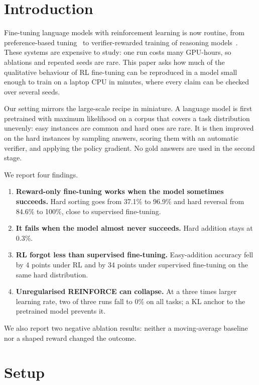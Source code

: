 \documentclass[10pt,twocolumn]{article}
\begin{document}
\section{Introduction}
Fine-tuning language models with reinforcement learning is now routine, from preference-based
tuning~\cite{ouyang2022} to verifier-rewarded training of reasoning models~\cite{shao2024,guo2025}.
These systems are expensive to study: one run costs many GPU-hours, so ablations and repeated seeds
are rare. This paper asks how much of the qualitative behaviour of RL fine-tuning can be reproduced
in a model small enough to train on a laptop CPU in minutes, where every claim can be checked over
several seeds.

Our setting mirrors the large-scale recipe in miniature. A language model is first pretrained with
maximum likelihood on a corpus that covers a task distribution unevenly: easy instances are common
and hard ones are rare. It is then improved on the hard instances by sampling answers, scoring them
with an automatic verifier, and applying the policy gradient. No gold answers are used in the second
stage.

We report four findings.
\begin{enumerate}
\itemsep0pt
\item \textbf{Reward-only fine-tuning works when the model sometimes succeeds.} Hard sorting goes
from 37.1\% to 96.9\% and hard reversal from 84.6\% to 100\%, close to supervised fine-tuning.
\item \textbf{It fails when the model almost never succeeds.} Hard addition stays at 0.3\%.
\item \textbf{RL forgot less than supervised fine-tuning.} Easy-addition accuracy fell by 4 points
under RL and by 34 points under supervised fine-tuning on the same hard distribution.
\item \textbf{Unregularised REINFORCE can collapse.} At a three times larger learning rate, two of
three runs fall to 0\% on all tasks; a KL anchor to the pretrained model prevents it.
\end{enumerate}
We also report two negative ablation results: neither a moving-average baseline nor a shaped reward
changed the outcome.

\section{Setup}
\end{document}
